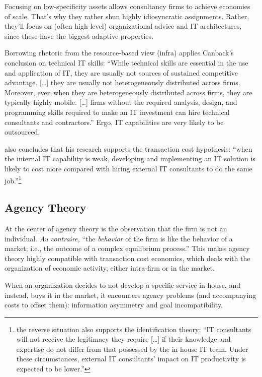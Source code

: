 \documentclass[12pt]{article}
\begin{document}
Focusing on low-specificity assets allows consultancy firms to achieve
economies of scale. That's why they rather shun highly idiosyncratic
assignments. Rather, they'll focus on (often high-level) organizational
advice and IT architectures, since these have the biggest adaptive
properties.

Borrowing rhetoric from the resource-based view (infra)
\citet[498]{mata1995} applies Canback's conclusion on technical IT
skills: ``While technical skills are essential in the use and
application of IT, they are usually not sources of sustained competitive
advantage. {[}\ldots{]} they are usually not heterogeneously distributed
across firms. Moreover, even when they are heterogeneously distributed
across firms, they are typically highly mobile. {[}\ldots{]} firms
without the required analysis, design, and programming skills required
to make an IT investment can hire technical consultants and
contractors.'' Ergo, IT capabilities are very likely to be outsourced.

\citet[16-17]{nevo2007} also concludes that his research supports the
transaction cost hypothesis: ``when the internal IT capability is weak,
developing and implementing an IT solution is likely to cost more
compared with hiring external IT consultants to do the same
job.''\footnote{the reverse situation also supports the identification
  theory: ``IT consultants will not receive the legitimacy they require
  {[}\ldots{]} if their knowledge and expertise do not differ from that
  possessed by the in-house IT team. Under these circumstances, external
  IT consultants' impact on IT productivity is expected to be lower.''}

\hypertarget{agency-theory}{%
\subsection{Agency Theory}\label{agency-theory}}

At the center of agency theory is the observation that the firm is not
an individual. \emph{Au contraire,} ``the \emph{behavior} of the firm is
like the behavior of a market; i.e., the outcome of a complex
equilibrium process.'' \citep[ 311]{jensen1976} This makes agency theory
highly compatible with transaction cost economics, which deals with the
organization of economic activity, either intra-firm or in the market.

When an organization decides to not develop a specific service in-house,
and instead, buys it in the market, it encounters agency problems (and
accompanying costs to offset them): information asymmetry and goal
incompatibility.
\end{document}
